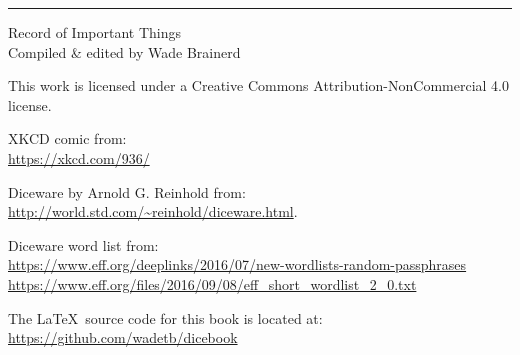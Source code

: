 

\vfill
\rule{\textwidth}{.2pt}
\vspace{.25in}

\small Record of Important Things \ccbync \\
\tiny Compiled \& edited by Wade Brainerd

This work is licensed under a Creative Commons Attribution-NonCommercial 4.0 license.

XKCD comic from: \\
\url{https://xkcd.com/936/}

Diceware by Arnold G. Reinhold from: \\
\url{http://world.std.com/~reinhold/diceware.html}. 

Diceware word list from: \\ \url{https://www.eff.org/deeplinks/2016/07/new-wordlists-random-passphrases} \\
\url{https://www.eff.org/files/2016/09/08/eff_short_wordlist_2_0.txt}

The \LaTeX\ source code for this book is located at: \\ \url{https://github.com/wadetb/dicebook}

